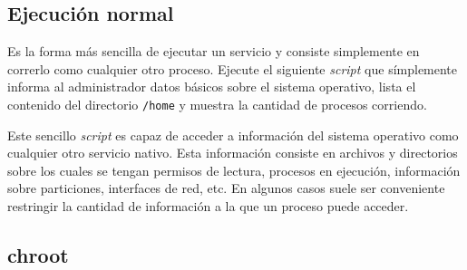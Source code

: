 \subsection{Ejecución normal}
\begin{questions}
  \question Es la forma más sencilla de ejecutar un servicio y consiste
  simplemente en correrlo como cualquier otro proceso. Ejecute el siguiente
  \textit{script} que símplemente informa al administrador datos básicos
  sobre el sistema operativo, lista el contenido del directorio
  \texttt{/home} y muestra la cantidad de procesos corriendo.
  
  

  Este sencillo \textit{script} es capaz de acceder a información del
  sistema operativo como cualquier otro servicio nativo. Esta información
  consiste en archivos y directorios sobre los cuales se tengan permisos de
  lectura, procesos en ejecución, información sobre particiones, interfaces
  de red, etc. En algunos casos suele ser conveniente restringir la
  cantidad de información a la que un proceso puede acceder.
  
\end{questions}

\subsection{chroot}

